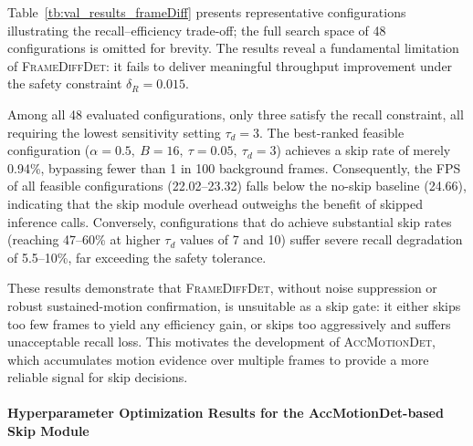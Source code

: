 \documentclass[final,3p,times,twocolumn]{elsarticle}
\begin{document}
Table~\ref{tb:val_results_frameDiff} presents representative
configurations illustrating the recall--efficiency trade-off; the full
search space of 48 configurations is omitted for brevity. The results
reveal a fundamental limitation of \textsc{FrameDiffDet}: it fails to
deliver meaningful throughput improvement under the safety constraint
$\delta_R = 0.015$.

Among all 48 evaluated configurations, only three satisfy the recall
constraint, all requiring the lowest sensitivity setting $\tau_d = 3$.
The best-ranked feasible configuration
($\alpha{=}0.5,\ B{=}16,\ \tau{=}0.05,\ \tau_d{=}3$) achieves a skip
rate of merely 0.94\%, bypassing fewer than 1 in 100 background frames.
Consequently, the FPS of all feasible configurations (22.02--23.32)
falls below the no-skip baseline (24.66), indicating that the skip
module overhead outweighs the benefit of skipped inference calls.
Conversely, configurations that do achieve substantial skip rates
(reaching 47--60\% at higher $\tau_d$ values of 7 and 10) suffer severe
recall degradation of 5.5--10\%, far exceeding the safety tolerance.

These results demonstrate that \textsc{FrameDiffDet}, without noise
suppression or robust sustained-motion confirmation, is unsuitable as a
skip gate: it either skips too few frames to yield any efficiency gain,
or skips too aggressively and suffers unacceptable recall loss. This
motivates the development of \textsc{AccMotionDet}, which accumulates
motion evidence over multiple frames to provide a more reliable signal
for skip decisions.

\paragraph{Hyperparameter Optimization Results for the AccMotionDet-based
Skip Module}\label{sec:accMotionResults}
\end{document}
